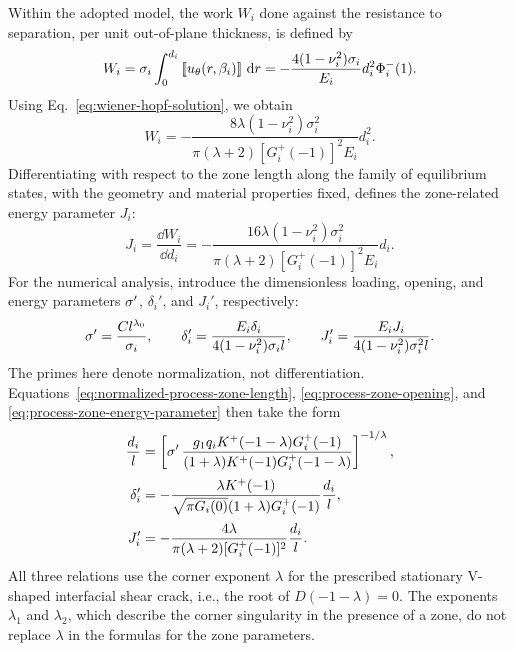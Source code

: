 Within the adopted model, the work $W_i$ done against the resistance
to separation, per unit out-of-plane thickness, is defined
by~\cite{Cherepanov1986}
\begin{equation*}
  W_i=\sigma_i\int_0^{d_i}
      \left[\!\left[u_\theta(r,\beta_i)\right]\!\right]\,\mathop{}\!\mathrm{d} r
  =-\frac{4(1-\nu_i^2)\sigma_i}{E_i}d_i^2\Phi_i^-(1).
\end{equation*}
Using Eq.~\eqref{eq:wiener-hopf-solution}, we obtain
\begin{equation*}
  W_i=-\frac{8\lambda(1-\nu_i^2)\sigma_i^2}
  {\pi(\lambda+2)[G_i^+(-1)]^2E_i}d_i^2.
\end{equation*}
Differentiating with respect to the zone length along the family of
equilibrium states, with the geometry and material properties fixed,
defines the zone-related energy parameter $J_i$:
\begin{equation}
\label{eq:process-zone-energy-parameter}
  J_i=\frac{\dd W_i}{\dd d_i}
  =-\frac{16\lambda(1-\nu_i^2)\sigma_i^2}
  {\pi(\lambda+2)[G_i^+(-1)]^2E_i}d_i.
\end{equation}
For the numerical analysis, introduce the dimensionless loading,
opening, and energy parameters $\sigma^{\prime}$, $\delta_i'$, and $J_i'$,
respectively:
\begin{equation*}
  \sigma^{\prime}=\frac{Cl^{\lambda_0}}{\sigma_i},
  \qquad
  \delta_i'=\frac{E_i\delta_i}
  {4(1-\nu_i^2)\sigma_i l},
  \qquad
  J_i'=\frac{E_iJ_i}
  {4(1-\nu_i^2)\sigma_i^2l}.
\end{equation*}
The primes here denote normalization, not differentiation.
Equations~\eqref{eq:normalized-process-zone-length},
\eqref{eq:process-zone-opening}, and
\eqref{eq:process-zone-energy-parameter} then take the form
\begin{equation*}
\begin{aligned}
  \frac{d_i}{l}
    &=\left[
      \sigma^{\prime}\,
      \frac{g_1q_iK^+(-1-\lambda)G_i^+(-1)}
      {(1+\lambda)K^+(-1)G_i^+(-1-\lambda)}
    \right]^{-1/\lambda},\\[2pt]
  \delta_i'
    &=-\frac{\lambda K^+(-1)}
      {\sqrt{\pi G_i(0)}(1+\lambda)G_i^+(-1)}
      \frac{d_i}{l},\\[2pt]
  J_i'
    &=-\frac{4\lambda}
      {\pi(\lambda+2)[G_i^+(-1)]^2}
      \frac{d_i}{l}.
\end{aligned}
\end{equation*}
All three relations use the corner exponent $\lambda$ for the prescribed
stationary V-shaped interfacial shear crack, i.e., the root of
$D(-1-\lambda)=0$.
The exponents $\lambda_1$ and $\lambda_2$, which describe the corner
singularity in the presence of a zone, do not replace $\lambda$
in the formulas for the zone parameters.

